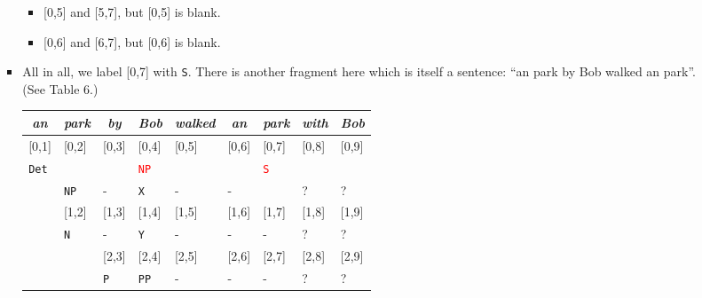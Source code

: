 \documentclass[a4paper]{article}
\begin{document}
\begin{enumerate}
\begin{enumerate}
\begin{enumerate}
\begin{itemize}
\begin{itemize}
\item{} [0,5] and [5,7], but [0,5] is blank.
\item{} [0,6] and [6,7], but [0,6] is blank.
\end{itemize}
\item All in all, we label [0,7] with \texttt{S}. There is another fragment here which is itself a sentence: ``an park by Bob walked an park''. (See Table 6.)
\begin{table}[hp]
\centering
\begin{tabular}{ccccccccc}
\textit{an} & \textit{park} & \textit{by} & \textit{Bob} & \textit{walked} & \textit{an} & \textit{park} & \textit{with} & \textit{Bob}\\
\hline
\multicolumn{1}{|l|}{[0,1]} & \multicolumn{1}{l|}{[0,2]} & \multicolumn{1}{l|}{[0,3]} & \multicolumn{1}{l|}{[0,4]} & \multicolumn{1}{l|}{[0,5]} & \multicolumn{1}{l|}{[0,6]} & \multicolumn{1}{l|}{[0,7]} & \multicolumn{1}{l|}{[0,8]} & \multicolumn{1}{l|}{[0,9]} \\
\multicolumn{1}{|l|}{\texttt{Det}} & \multicolumn{1}{l|}{} & \multicolumn{1}{l|}{} & \multicolumn{1}{l|}{\textcolor{red}{\texttt{NP}}} & \multicolumn{1}{l|}{} & \multicolumn{1}{l|}{} & \multicolumn{1}{l|}{\textcolor{red}{\texttt{S}}} & \multicolumn{1}{l|}{} & \multicolumn{1}{l|}{} \\
\multicolumn{1}{|l|}{} & \multicolumn{1}{l|}{\texttt{NP}} & \multicolumn{1}{l|}{-} & \multicolumn{1}{l|}{\texttt{X}} & \multicolumn{1}{l|}{-} & \multicolumn{1}{l|}{-} & \multicolumn{1}{l|}{} & \multicolumn{1}{l|}{?} & \multicolumn{1}{l|}{?} \\
\hline
 & \multicolumn{1}{|l|}{[1,2]} & \multicolumn{1}{l|}{[1,3]} & \multicolumn{1}{l|}{[1,4]} & \multicolumn{1}{l|}{[1,5]} & \multicolumn{1}{l|}{[1,6]} & \multicolumn{1}{l|}{[1,7]} & \multicolumn{1}{l|}{[1,8]} & \multicolumn{1}{l|}{[1,9]} \\
 & \multicolumn{1}{|l|}{\texttt{N}} & \multicolumn{1}{l|}{-} & \multicolumn{1}{l|}{\texttt{Y}} & \multicolumn{1}{l|}{-} & \multicolumn{1}{l|}{-} & \multicolumn{1}{l|}{-} & \multicolumn{1}{l|}{?} & \multicolumn{1}{l|}{?} \\
\cline{2-9}
 & & \multicolumn{1}{|l|}{[2,3]} & \multicolumn{1}{l|}{[2,4]} & \multicolumn{1}{l|}{[2,5]} & \multicolumn{1}{l|}{[2,6]} & \multicolumn{1}{l|}{[2,7]} & \multicolumn{1}{l|}{[2,8]} & \multicolumn{1}{l|}{[2,9]} \\
 & & \multicolumn{1}{|l|}{\texttt{P}} & \multicolumn{1}{l|}{\texttt{PP}} & \multicolumn{1}{l|}{-} & \multicolumn{1}{l|}{-} & \multicolumn{1}{l|}{-} & \multicolumn{1}{l|}{?} & \multicolumn{1}{l|}{?} \\

\end{tabular}
\end{table}
\end{itemize}
\end{enumerate}
\end{enumerate}
\end{enumerate}
\end{document}
